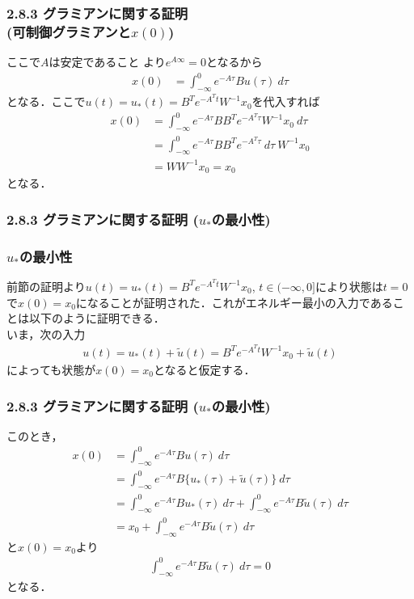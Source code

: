 \begin{frame}[t]
\frametitle{2.8.3 グラミアンに関する証明\\ (可制御グラミアンと$x(0)$)}
ここで$A$は安定であること
より$e^{A\infty}=0$となるから
\begin{align}
	x(0) 
	&= \int_{-\infty}^{0} e^{-A\tau}Bu(\tau) \ d \tau
\end{align}
となる．ここで$u(t)=u_*(t) = B^T e^{-A^T t} W^{-1} x_0$を代入すれば
\begin{align}
	x(0) 
	&= \int_{-\infty}^{0} e^{-A\tau}B B^T e^{-A^T \tau} W^{-1} x_0 \ d \tau
\nonumber \\
	&= \int_{-\infty}^{0} e^{-A\tau}B B^T e^{-A^T \tau} \ d \tau \ W^{-1} x_0 \nonumber \\
	&= W W^{-1} x_0 = x_0
\end{align}
となる．

\end{frame}

\begin{frame}[t]
\frametitle{2.8.3 グラミアンに関する証明 ($u_*$の最小性)}
\subsubsection{$u_*$の最小性}

前節の証明より$u(t)=u_*(t) = B^T e^{-A^T t} W^{-1} x_0$, $t\in(-\infty,0]$により状態は$t=0$で$x(0)=x_0$になることが証明された．これがエネルギー最小の入力であることは以下のように証明できる．
\\[3mm]

いま，次の入力
\begin{align}
	u(t)=u_*(t)+ \tilde{u}(t) = B^T e^{-A^T t} W^{-1} x_0 + \tilde{u}(t)
\end{align}
によっても状態が$x(0)=x_0$となると仮定する．
\end{frame}

\begin{frame}[t]
\frametitle{2.8.3 グラミアンに関する証明 ($u_*$の最小性)}
このとき，
\begin{align}
	x(0) 
	&= \int_{-\infty}^{0} e^{-A\tau}B u(\tau) \ d \tau
\nonumber \\
	&= \int_{-\infty}^{0} e^{-A\tau}B \{u_*(\tau) + \tilde{u}(\tau) \} \ d \tau
\nonumber \\
	&= \int_{-\infty}^{0} e^{-A\tau}B u_*(\tau)  \ d \tau
	   + \int_{-\infty}^{0} e^{-A\tau}B \tilde{u}(\tau) \ d \tau
\nonumber \\
	&= x_0+ \int_{-\infty}^{0} e^{-A\tau}B \tilde{u}(\tau) \ d \tau
\end{align}
と$x(0)=x_0$より
\begin{align}
	\int_{-\infty}^{0} e^{-A\tau}B \tilde{u}(\tau) \ d \tau = 0
\end{align}
となる．
\end{frame}

